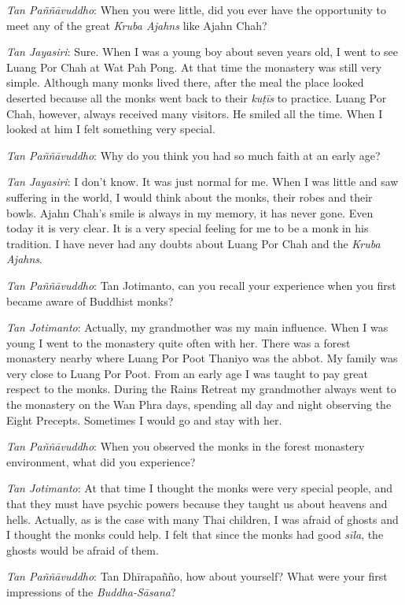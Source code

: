 \emph{Tan Paññāvuddho}: When you were little, did you ever have the
opportunity to meet any of the great \emph{Kruba Ajahns} like Ajahn
Chah? 

\emph{Tan Jayasiri}: Sure. When I was a young boy about seven years old, 
I went to see Luang Por Chah at Wat Pah Pong. At that time the monastery
was still very simple. Although many monks lived there, after the meal
the place looked deserted because all the monks went back to their
\emph{kuṭīs} to practice. Luang Por Chah, however, always received many
visitors. He smiled all the time. When I looked at him I felt something
very special. 

\emph{Tan Paññāvuddho}: Why do you think you had so much faith at an
early age? 

\emph{Tan Jayasiri}: I don't know. It was just normal for me. When I was
little and saw suffering in the world, I would think about the monks, 
their robes and their bowls. Ajahn Chah's smile is always in my memory, 
it has never gone. Even today it is very clear. It is a very special
feeling for me to be a monk in his tradition. I have never had any
doubts about Luang Por Chah and the \emph{Kruba Ajahns}.

\emph{Tan Paññāvuddho}: Tan Jotimanto, can you recall your experience
when you first became aware of Buddhist monks? 

\emph{Tan Jotimanto}: Actually, my grandmother was my main influence. 
When I was young I went to the monastery quite often with her. There was
a forest monastery nearby where Luang Por Poot Thaniyo was the abbot. My
family was very close to Luang Por Poot. From an early age I was taught
to pay great respect to the monks. During the Rains Retreat my
grandmother always went to the monastery on the Wan Phra days, spending
all day and night observing the Eight Precepts. Sometimes I would go and
stay with her. 

\emph{Tan Paññāvuddho}: When you observed the monks in the forest
monastery environment, what did you experience? 

\emph{Tan Jotimanto}: At that time I thought the monks were very special
people, and that they must have psychic powers because they taught us
about heavens and hells. Actually, as is the case with many Thai
children, I was afraid of ghosts and I thought the monks could help. I
felt that since the monks had good \emph{sīla}, the ghosts would be
afraid of them. 

\emph{Tan Paññāvuddho}: Tan Dhīrapañño, how about yourself? What were
your first impressions of the \emph{Buddha-Sāsana}?


